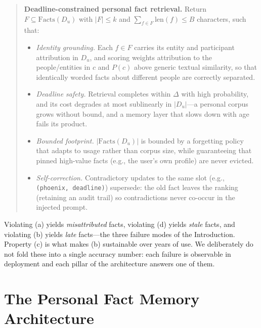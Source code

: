 \documentclass[letterpaper]{article}
\newcommand{\Du}{D_u}
\newcommand{\deadline}{\Delta}
\newcommand{\factset}{F}
\begin{document}
\begin{quote}
\textbf{Deadline-constrained personal fact retrieval.} Return
$\factset \subseteq \mathrm{Facts}(\Du)$ with $|\factset| \le k$ and
$\sum_{f \in \factset} \mathrm{len}(f) \le B$ characters, such that:
\begin{itemize}
\item[(a)] \emph{Identity grounding.} Each $f \in \factset$ carries its
  entity and participant attribution in $\Du$, and scoring weights
  attribution to the people/entities in $c$ and $P(c)$ above generic
  textual similarity, so that identically worded facts about different
  people are correctly separated.
\item[(b)] \emph{Deadline safety.} Retrieval completes within $\deadline$
  with high probability, and its cost degrades at most sublinearly in
  $|\Du|$---a personal corpus grows without bound, and a memory layer
  that slows down with age fails its product.
\item[(c)] \emph{Bounded footprint.} $|\mathrm{Facts}(\Du)|$ is bounded by
  a forgetting policy that adapts to usage rather than corpus size, while
  guaranteeing that pinned high-value facts (e.g., the user's own profile)
  are never evicted.
\item[(d)] \emph{Self-correction.} Contradictory updates to the same slot
  (e.g., \texttt{(phoenix, deadline)}) supersede: the old fact leaves the
  ranking (retaining an audit trail) so contradictions never co-occur in
  the injected prompt.
\end{itemize}
\end{quote}

Violating (a) yields \emph{misattributed} facts, violating (d) yields
\emph{stale} facts, and violating (b) yields \emph{late} facts---the three
failure modes of the Introduction. Property (c) is what makes (b)
sustainable over years of use. We deliberately do not fold these into a
single accuracy number: each failure is observable in deployment and each
pillar of the architecture answers one of them.

\section{The Personal Fact Memory Architecture}
\end{document}
